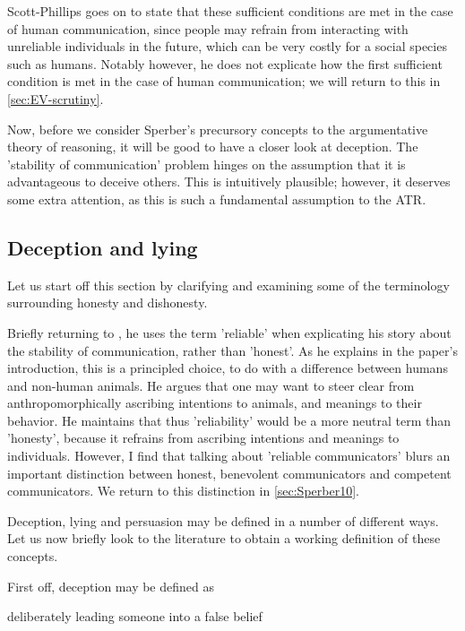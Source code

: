 Scott-Phillips goes on to state that these sufficient conditions are met in the case of human communication, since people may refrain from interacting with unreliable individuals in the future, which can be very costly for a social species such as humans.
Notably however, he does not explicate how the first sufficient condition is met in the case of human communication; we will return to this in \cref{sec:EV-scrutiny}.

Now, before we consider Sperber's precursory concepts to the argumentative theory of reasoning, it will be good to have a closer look at deception. The 'stability of communication' problem hinges on the assumption that it is advantageous to deceive others. This is intuitively plausible; however, it deserves some extra attention, as this is such a fundamental assumption to the ATR.

\subsection{Deception and lying}
\label{sec:deception}

Let us start off this section by clarifying and examining some of the terminology surrounding honesty and dishonesty.

Briefly returning to \citet{Scott-Phillips08}, he uses the term 'reliable' when explicating his story about the stability of communication, rather than 'honest'. As he explains in the paper's introduction, this is a principled choice, to do with a difference between humans and non-human animals. He argues that one may want to steer clear from anthropomorphically ascribing intentions to animals, and meanings to their behavior. He maintains that thus 'reliability' would be a more neutral term than 'honesty', because it refrains from ascribing intentions and meanings to individuals.
However, I find that talking about 'reliable communicators' blurs an important distinction between honest, benevolent communicators and competent communicators. We return to this distinction in \cref{sec:Sperber10}.

Deception, lying and persuasion may be defined in a number of different ways. Let us now briefly look to the literature to obtain a working definition of these concepts.

First off, deception may be defined as
\begin{quoting}
    deliberately leading someone into a false belief
    \hfill \citep[p.~358]{Meibauer18}
\end{quoting}

